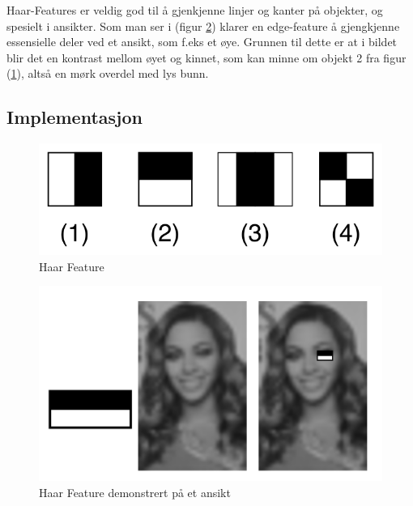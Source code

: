 Haar-Features er veldig god til å gjenkjenne linjer og kanter på objekter, og spesielt i ansikter. Som man ser i (figur \ref{fig:haarface}) klarer en edge-feature å gjengkjenne essensielle deler ved et ansikt, som f.eks et øye. Grunnen til dette er at i bildet blir det en kontrast mellom øyet og kinnet, som kan minne om objekt 2 fra figur (\ref{fig:haarfeat}), altså en mørk overdel med lys bunn.

\subsection{Implementasjon}


\begin{figure}
\begin{center}
    \includegraphics[width=0.4\columnwidth]{bilder/Anonymisering/VJ_featureTypes.svg.png}
     \caption{Haar Feature\label{fig:haarfeat}} 
\end{center}
\end{figure}

\begin{figure}
\begin{center}
    \includegraphics[width=0.5\columnwidth]{bilder/Anonymisering/haarface-example.png}
     \caption{Haar Feature demonstrert på et ansikt \label{fig:haarface}} 
\end{center}
\end{figure}
 
